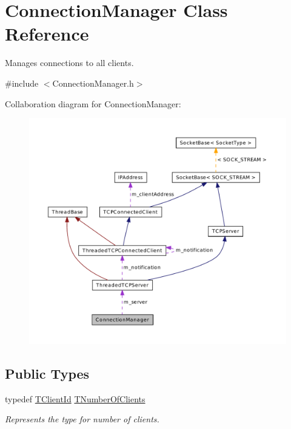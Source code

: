 \hypertarget{class_connection_manager}{\section{Connection\-Manager Class Reference}
\label{class_connection_manager}
}


Manages connections to all clients.  




{\ttfamily \#include $<$Connection\-Manager.\-h$>$}



Collaboration diagram for Connection\-Manager\-:\nopagebreak
\begin{figure}[H]
\begin{center}
\leavevmode
\includegraphics[width=350pt]{class_connection_manager__coll__graph}
\end{center}
\end{figure}
\subsection*{Public Types}
\begin{DoxyCompactItemize}
\item 
typedef \hyperlink{class_connection_manager_a0c3634c02b95af84a477b253fcf2b29a}{T\-Client\-Id} \hyperlink{class_connection_manager_a0f5f5b25b063cfebfac54b25cda131f7}{T\-Number\-Of\-Clients}
\begin{DoxyCompactList}\small\item\em Represents the type for number of clients. \end{DoxyCompactList}\end{DoxyCompactItemize}
